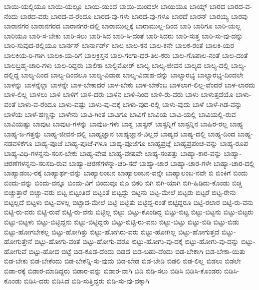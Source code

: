 {ಬಾಯಿ-ಯಲ್ಲಿಯೂ
ಬಾಯಿ-ಯಲ್ಲೂ
ಬಾಯಿ-ಯಿಂದ
ಬಾಯಿ-ಯಿಂದಲೇ
ಬಾಯಿಯೂ
ಬಾಯ್ಸ್
ಬಾರದ
ಬಾರದ-ವ-ನೆಂದು
ಬಾರದ-ವರು
ಬಾರದ-ವ-ರೆಂದೂ
ಬಾರದ-ವು-ಗಳು
ಬಾರದ-ವು-ಗಳೂ
ಬಾರದೆ
ಬಾರನ್
ಬಾರಯ್ಯ
ಬಾರವು
ಬಾರಾನಗರ
ಬಾರಾನಗರದ
ಬಾರಾನಗರ-ದಲ್ಲಿ
ಬಾರಾಮುಲ್ಲಕ್ಕೆ
ಬಾರಾಮುಲ್ಲ-ದಿಂದ
ಬಾರಿ
ಬಾರಿಗೂ
ಬಾರಿ-ಯಲ್ಲ
ಬಾರಿಯೂ
ಬಾರಿ-ಸ-ಬೇಕು
ಬಾರಿ-ಸಲು
ಬಾರಿ-ಸಿದ
ಬಾರಿ-ಸಿ-ದಂತೆ
ಬಾರಿ-ಸಿದರು
ಬಾರಿ-ಸುತ್ತ
ಬಾರಿ-ಸು-ವು-ದನ್ನು
ಬಾರಿ-ಸುವುದ-ರಲ್ಲಿಯೂ
ಬಾರ್ನಸ್
ಬಾರ್ನಾರ್ಡ್
ಬಾಲ
ಬಾಲ-ಕನ
ಬಾಲ-ಕನೇ
ಬಾಲಕ-ರಂತೆ
ಬಾಲಕಿ-ಯರ
ಬಾಲಕಿಯ-ರಿ-ಗಾಗಿ
ಬಾಲಕಿ-ಯ-ರಿಗೆ
ಬಾಲಕ್ರಿಸ್ತನ
ಬಾಲ-ಗಂಗಾ-ಧರ-ತಿಲ-ಕರು
ಬಾಲ-ಗೊಪಾಲ-ನಂತೆ
ಬಾಲ-ದಂತೆ
ಬಾಲಬ್ರಹ್ಮ-ಚಾರಿ-ಗಳು
ಬಾಲ-ರಿದ್ದರು
ಬಾಲಿಕಾ
ಬಾಲ್ಟಿಮೋರ್
ಬಾಲ್ಯ
ಬಾಲ್ಯ-ಜೀವನ
ಬಾಲ್ಯದ
ಬಾಲ್ಯ-ದಲ್ಲಿ
ಬಾಲ್ಯ-ದಲ್ಲಿದ್ದ
ಬಾಲ್ಯ-ದಿಂದ
ಬಾಲ್ಯ-ದಿಂದಲೂ
ಬಾಲ್ಯ-ವಿವಾಹ
ಬಾಲ್ಯ-ವಿವಾಹ-ವನ್ನು
ಬಾಲ್ಯಾರಭ್ಯ
ಬಾಲ್ಯಾರಭ್ಯ-ದಿಂದಲೇ
ಬಾಳನ್ನು
ಬಾಳನ್ನೆಲ್ಲಾ
ಬಾಳನ್ನೇ
ಬಾಳ-ಬೇಕಾದರೆ
ಬಾಳ-ಬೇಕು
ಬಾಳ-ಬೇಕೆಂಬ
ಬಾಳಲಾಗ-ಲಿಲ್ಲ-ವೆಂದರೆ
ಬಾಳ-ಲಾರದು
ಬಾಳ-ಲಿಲ್ಲ
ಬಾಳಲು
ಬಾಳಿ
ಬಾಳಿಗೆ
ಬಾಳಿ-ದರು
ಬಾಳಿನ
ಬಾಳಿ-ನಿಂದ
ಬಾಳಿ-ರು-ವರು
ಬಾಳು
ಬಾಳುತ್ತದೆಯೊ
ಬಾಳು-ವಂತೆ
ಬಾಳು-ವ-ರೆಂದೂ
ಬಾಳು-ವಷ್ಟು
ಬಾಳು-ವು-ದಕ್ಕೆ
ಬಾಳು-ವುದ-ರಲ್ಲಿ
ಬಾಳು-ವುದು
ಬಾಳೆ
ಬಾಳೆ-ಗಿಡ-ವನ್ನು
ಬಾಳೆಯ
ಬಾಳೆ-ಹಣ್ಣನ್ನು
ಬಾಳೇನು
ಬಾವಿ-ಗಿಂತ
ಬಾವಿಗೂ
ಬಾವಿಗೆ
ಬಾವಿಯ
ಬಾವಿ-ಯಲ್ಲಿ
ಬಾವಿಯಲ್ಲಿ-ರುವ
ಬಾವಿಯಷ್ಟು
ಬಾವುಟ
ಬಾವುಟ-ಗಳನ್ನು
ಬಾವುಟ-ಗಳು
ಬಾಸ್ಟ
ಬಾಸ್ಟನ್
ಬಾಸ್ಟನ್ನಿಗೆ
ಬಾಸ್ಟನ್ನಿನ
ಬಾಹಿರ-ರಲ್ಲ
ಬಾಹ್ಯ
ಬಾಹ್ಯ-ಜ-ಗತ್ತನ್ನು
ಬಾಹ್ಯ-ಜೀವನ-ದಲ್ಲಿ
ಬಾಹ್ಯಜ್ಞಾನ
ಬಾಹ್ಯಜ್ಞಾನ-ವಿಲ್ಲದೆ
ಬಾಹ್ಯದ
ಬಾಹ್ಯ-ದಲ್ಲಿ
ಬಾಹ್ಯ-ದಿಂದ
ಬಾಹ್ಯ-ನಡವಳಿಕೆಗೂ
ಬಾಹ್ಯ-ಪೂಜೆ
ಬಾಹ್ಯ-ಪೂಜೆ-ಗಳೂ
ಬಾಹ್ಯ-ಪೂಜೆಗೂ
ಬಾಹ್ಯಪ್ರಜ್ಞೆ
ಬಾಹ್ಯಪ್ರಪಂಚ-ವನ್ನು
ಬಾಹ್ಯ-ರೂಪ
ಬಾಹ್ಯ-ವಿಧಿ-ಗಳನ್ನನು-ಸರಿಸ-ಬೇಕು
ಬಾಹ್ಯ-ವೇಷ
ಬಾಹ್ಯ-ವೇಷವೇ
ಬಾಹ್ಯ-ಸಂಪತ್ತು
ಬಾಹ್ಯಾ-ಕಾರ-ವನ್ನು
ಬಾಹ್ಯಾ-ಚರಣೆಗಳನ್ನನು-ಸರಿಸದಿ-ರುವ
ಬಾಹ್ಯಾ-ಚರಣೆಗಳನ್ನಾ-ಚರಿ-ಸದೆ
ಬಾಹ್ಯಾ-ಚಾರ
ಬಾಹ್ಯಾ-ಚಾರ-ಗಳೇ
ಬಾಹ್ಯಾ-ಚಾರ-ದಲ್ಲಿ
ಬಾಹ್ಯಾಡಂಬ-ರಕ್ಕೆ
ಬಾಹ್ಯಾರ್ಥ-ವನ್ನು
ಬಾಹ್ಯಾಲಂಬನ
ಬಾಹ್ಯಾಲಂಬನ-ವನ್ನೇ
ಬಾಹ್ಯಾಲಂಬ-ನವೇ
ಬಿ
ಬಿಂಕಿಗೆ
ಬಿಂದು
ಬಿಂದು-ವನ್ನು
ಬಿಂದು-ವನ್ನೂ
ಬಿಂದು-ವಿಗೆ
ಬಿಂದುವೂ
ಬಿಎ
ಬಿಕರಿ
ಬಿಗಿ
ಬಿಗಿ-ಯಾಗಿ
ಬಿಗಿ-ಹಿಡಿದು-ಕೊಂಡು
ಬಿಚ್ಚಿ
ಬಿಚ್ಚುತ್ತಾರೆ
ಬಿಚ್ಚು-ವರು
ಬಿಟ್ಟ
ಬಿಟ್ಟಂತಿದೆ
ಬಿಟ್ಟಂತೆ
ಬಿಟ್ಟದ್ದು
ಬಿಟ್ಟನು
ಬಿಟ್ಟ-ಮೇಲೆ
ಬಿಟ್ಟರು
ಬಿಟ್ಟರೆ
ಬಿಟ್ಟ-ರೇನು
ಬಿಟ್ಟಲ್ಲದೆ
ಬಿಟ್ಟಳು
ಬಿಟ್ಟ-ವಳಲ್ಲ
ಬಿಟ್ಟಾದ-ಮೇಲೆ
ಬಿಟ್ಟಿ
ಬಿಟ್ಟಿತು
ಬಿಟ್ಟಿದ್ದ-ರಂತೆ
ಬಿಟ್ಟಿದ್ದರೂ
ಬಿಟ್ಟಿ-ರಲಾರ
ಬಿಟ್ಟಿ-ರು-ವನು
ಬಿಟ್ಟಿ-ರು-ವರು
ಬಿಟ್ಟಿ-ರುವೆ
ಬಿಟ್ಟಿ-ರು-ವೆನು
ಬಿಟ್ಟಿಲ್ಲ
ಬಿಟ್ಟು
ಬಿಟ್ಟು-ಕೊಂಡಿದ್ದ
ಬಿಟ್ಟು-ಬಿಟ್ಟ
ಬಿಟ್ಟು-ಬಿಟ್ಟನು
ಬಿಟ್ಟು-ಬಿಟ್ಟರು
ಬಿಟ್ಟು-ಬಿಟ್ಟಳು
ಬಿಟ್ಟು-ಬಿಟ್ಟಿದ್ದನು
ಬಿಟ್ಟು-ಬಿಟ್ಟಿದ್ದರು
ಬಿಟ್ಟು-ಬಿಟ್ಟಿ-ರು-ವನು
ಬಿಟ್ಟು-ಬಿಟ್ಟು
ಬಿಟ್ಟು-ಬಿಡಿ
ಬಿಟ್ಟು-ಬಿಡು
ಬಿಟ್ಟು-ಹೋಗಬೇಕಲ್ಲ
ಬಿಟ್ಟು-ಹೋಗಿತ್ತು
ಬಿಟ್ಟು-ಹೋಗಿರು-ವರು
ಬಿಟ್ಟು-ಹೋಗಿಲ್ಲ
ಬಿಟ್ಟು-ಹೋಗುತ್ತದೆ
ಬಿಟ್ಟು-ಹೋಗುತ್ತೇನೆ
ಬಿಟ್ಟು-ಹೋಗು-ವಂತೆ
ಬಿಟ್ಟು-ಹೋಗು-ವರೊ
ಬಿಟ್ಟು-ಹೋಗು-ವು-ದಕ್ಕೆ
ಬಿಟ್ಟು-ಹೋಗು-ವು-ದನ್ನು
ಬಿಟ್ಟು-ಹೋಗುವೆ
ಬಿಟ್ಟು-ಹೋದ
ಬಿಟ್ಟೆ
ಬಿಡ-ಕೂಡ-ದೆಂದು
ಬಿಡದೆ
ಬಿಡ-ಬಹು-ದೆಂದು
ಬಿಡ-ಬೇಕಾಗಿ
ಬಿಡ-ಬೇಕಾ-ಯಿತು
ಬಿಡ-ಬೇಕು
ಬಿಡ-ಬೇಕೆಂದು
ಬಿಡ-ಬೇಕೆನ್ನಿ-ಸು-ವುದು
ಬಿಡ-ಬೇಡ
ಬಿಡ-ಬೇಡಿ
ಬಿಡಲಿ
ಬಿಡ-ಲಿಲ್ಲ
ಬಿಡಲು
ಬಿಡಲೇ
ಬಿಡಾ-ರಕ್ಕೆ
ಬಿಡಾರ-ಮಾಡಿದ್ದರು
ಬಿಡಾರ-ವನ್ನು
ಬಿಡಾರ-ವಾಗಿ
ಬಿಡಿ
ಬಿಡಿ-ಸಲು
ಬಿಡಿಸಿ
ಬಿಡಿಸಿ-ಕೊಂಡರು
ಬಿಡಿಸಿ-ಕೊಂಡು
ಬಿಡಿಸಿ-ದರು
ಬಿಡಿಸಿದೆ
ಬಿಡಿ-ಸುತ್ತಿದ್ದರು
ಬಿಡಿ-ಸು-ವು-ದಕ್ಕಾಗಿ
}
